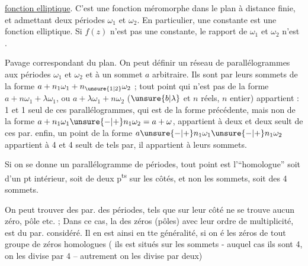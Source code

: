 \uline{fonction elliptique}. C'est une fonction méromorphe dans le plan à distance finie, et admettant deux périodes  $\omega_1$ et $\omega_2$. En particulier, une constante est une fonction elliptique. Si $f(z)$ n'est pas une constante, le rapport de $\omega_1$ et $\omega_2$ n'est  .


Pavage correspondant du plan. On peut définir un réseau de parallélogrammes  aux périodes $\omega_1$ et $\omega_2$ et à un sommet $a$ arbitraire. Ils sont  par leurs sommets de la forme $a+n_1\omega_1+n_{\unsure{1|2}}\omega_2$ ; tout point qui n'est pas de la forme $a+n\omega_1+\lambda\omega_1$, ou $a+\lambda\omega_1+n\omega_2$ ($\unsure{b|\lambda}$ et $n$ réels, $n$ entier) appartient : 1 et 1 seul de ces parallélogrammes,   qui est de la forme précédente, mais non de la forme $a+n_1\omega_1\unsure{-|+}n_1\omega_2=a+\omega$,  appartient à deux et deux seult de ces par.   enfin, un point de la forme $a\unsure{-|+}n_1\omega_1\unsure{-|+}n_1\omega_2$ appartient à 4 et 4 seult de tels par, il appartient à leurs sommets.

Si on se donne un parallélogramme de périodes, tout point est l'``homologue'' soit d'un pt intérieur, soit de deux p\textsuperscript{ts} sur les côtés, et non les sommets, soit des 4 sommets.  

On peut trouver des par. des périodes, tels que sur leur côté ne se trouve aucun zéro, pôle etc. ; Dans ce cas, la   des zéros (pôles) avec leur ordre de multiplicité, est  du par. considéré. Il en est ainsi en tte généralité, si on   é les zéros de tout groupe de zéros homologues ( ils est situés sur les sommets - auquel cas ils sont 4, on les divise par 4 -- autrement on les divise par deux)

